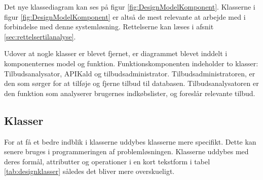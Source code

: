 Det nye klassediagram kan ses på figur \ref{fig:DesignModelKomponent}. Klasserne i figur \ref{fig:DesignModelKomponent} er altså de mest relevante at arbejde med i forbindelse med denne systemløsning. Rettelserne kan læses i afsnit \ref{sec:rettelsertilanalyse}.

Udover at nogle klasser er blevet fjernet, er diagrammet blevet inddelt i komponenternes model og funktion. Funktionskomponenten indeholder to klasser: Tilbudsanalysator, APIKald og tilbudsadministrator. Tilbudsadministratoren, er den som sørger for at tilføje og fjerne tilbud til databasen. Tilbudsanalysatoren er den funktion som analyserer brugernes indkøbslister, og foreslår relevante tilbud.


\subsection{Klasser}
For at få et bedre indblik i klasserne uddybes klasserne mere specifikt. Dette kan senere bruges i programmeringen af problemløsningen. Klasserne uddybes med deres formål, attributter og operationer i en kort tekstform i tabel \ref{tab:designklasser} således det bliver mere overskueligt.

